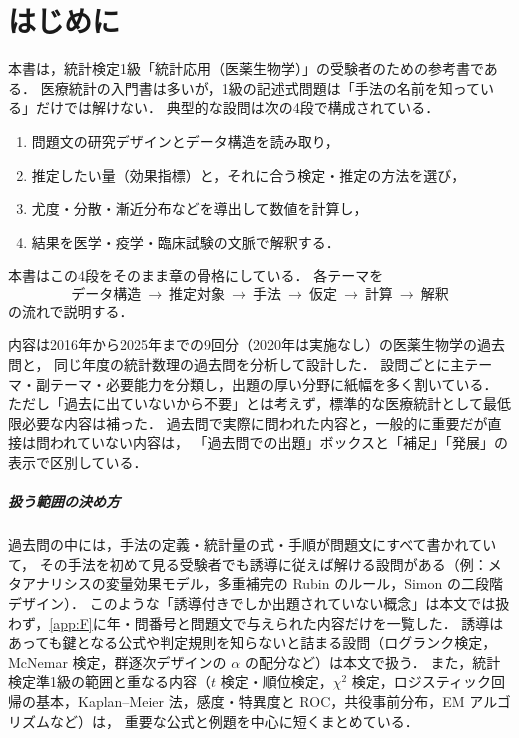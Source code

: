 \documentclass[a4paper,11pt,openany]{ltjsbook}
\begin{document}
\chapter*{はじめに}

本書は，統計検定1級「統計応用（医薬生物学）」の受験者のための参考書である．
医療統計の入門書は多いが，1級の記述式問題は「手法の名前を知っている」だけでは解けない．
典型的な設問は次の4段で構成されている．
\begin{enumerate}[label=(\arabic*)]
\item 問題文の研究デザインとデータ構造を読み取り，
\item 推定したい量（効果指標）と，それに合う検定・推定の方法を選び，
\item 尤度・分散・漸近分布などを導出して数値を計算し，
\item 結果を医学・疫学・臨床試験の文脈で解釈する．
\end{enumerate}
本書はこの4段をそのまま章の骨格にしている．
各テーマを
\[
\boxed{\ \text{データ構造}\ \rightarrow\ \text{推定対象}\ \rightarrow\ \text{手法}\ \rightarrow\ \text{仮定}\ \rightarrow\ \text{計算}\ \rightarrow\ \text{解釈}\ }
\]
の流れで説明する．

内容は2016年から2025年までの9回分（2020年は実施なし）の医薬生物学の過去問と，
同じ年度の統計数理の過去問を分析して設計した．
設問ごとに主テーマ・副テーマ・必要能力を分類し，出題の厚い分野に紙幅を多く割いている．
ただし「過去に出ていないから不要」とは考えず，標準的な医療統計として最低限必要な内容は補った．
過去問で実際に問われた内容と，一般的に重要だが直接は問われていない内容は，
「過去問での出題」ボックスと「補足」「発展」の表示で区別している．

\paragraph{扱う範囲の決め方}
過去問の中には，手法の定義・統計量の式・手順が問題文にすべて書かれていて，
その手法を初めて見る受験者でも誘導に従えば解ける設問がある（例：メタアナリシスの変量効果モデル，多重補完の Rubin のルール，Simon の二段階デザイン）．
このような「誘導付きでしか出題されていない概念」は本文では扱わず，\cref{app:F}に年・問番号と問題文で与えられた内容だけを一覧した．
誘導はあっても鍵となる公式や判定規則を知らないと詰まる設問（ログランク検定，McNemar 検定，群逐次デザインの $\alpha$ の配分など）は本文で扱う．
また，統計検定準1級の範囲と重なる内容（$t$ 検定・順位検定，$\chi^2$ 検定，ロジスティック回帰の基本，Kaplan--Meier 法，感度・特異度と ROC，共役事前分布，EM アルゴリズムなど）は，
重要な公式と例題を中心に短くまとめている．
\end{document}
